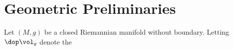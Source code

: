 \section{Geometric Preliminaries}
Let $(M,g)$ be a closed Riemannian manifold without boundary. Letting $\dop \vol_g$ denote the 